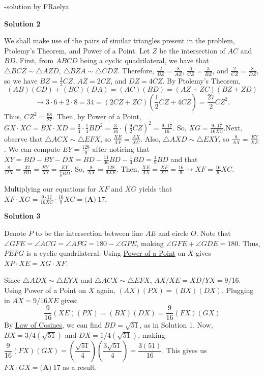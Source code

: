 \begin{enumerate}
 -solution by FRaelya

 



\textbf{Solution 2}

We shall make use of the pairs of similar triangles present in the problem, Ptolemy's Theorem, and Power of a Point. Let $Z$ be the intersection of $AC$ and $BD$. First, from $ABCD$ being a cyclic quadrilateral, we have that $\triangle BCZ \sim \triangle AZD$, $\triangle BZA \sim \triangle CDZ$. Therefore, $\frac{2}{BZ} = \frac{8}{AZ}$, $\frac{6}{CZ} = \frac{3}{BZ}$, and $\frac{2}{CZ} = \frac{8}{DZ}$, so we have $BZ = \frac{1}{2}CZ$, $AZ = 2CZ$, and $DZ = 4CZ$. By Ptolemy's Theorem, 
 \[(AB)(CD) + (BC)(DA) = (AC)(BD) = (AZ + ZC)(BZ + ZD)\] 
 \[\rightarrow 3 \cdot 6 + 2 \cdot 8 = 34 = \left(2CZ + ZC\right)\left(\frac{1}{2}CZ + 4CZ\right) = \frac{27}{2}CZ^2.\] Thus, $CZ^2 = \frac{68}{27}$. Then, by Power of a Point, $GX \cdot XC = BX \cdot XD = \frac{3}{4} \cdot \frac{1}{4}BD^2 = \frac{3}{16} \cdot \left(\frac{9}{2}CZ\right)^2 = \frac{9 \cdot 17}{16}$. So, $XG = \frac{9 \cdot 17}{16XC}$.Next, observe that $\triangle ACX \sim \triangle EFX$, so $\frac{XE}{XF} = \frac{AX}{XC}$. Also, $\triangle{AXD} \sim \triangle{EXY}$, so $\frac{8}{AX} = \frac{EY}{XE}$. We can compute $EY = \frac{128}{9}$ after noticing that $XY = BD - BY - DX = BD - \frac{11}{36}BD - \frac{1}{4}BD = \frac{4}{9}BD$ and that $\frac{8}{DX} = \frac{32}{BD} = \frac{EY}{XY} = \frac{EY}{\frac{4}{9}BD}$. So, $\frac{8}{AX} = \frac{128}{9XE}$. Then, $\frac{XE}{AX} = \frac{XF}{XC} = \frac{16}{9} \rightarrow XF = \frac{16}{9}XC$. 

 Multiplying our equations for $XF$ and $XG$ yields that $XF \cdot XG = \frac{9 \cdot 17}{16XC} \cdot \frac{16}{9}XC = \boxed{\textbf{(A)}\ 17}.$




\textbf{Solution 3}

Denote $P$ to be the intersection between line $AE$ and circle $O$. Note that $\angle GFE = \angle ACG = \angle APG = 180 - \angle GPE$, making $\angle GFE + \angle GDE = 180$. Thus, $PEFG$ is a cyclic quadrilateral. Using \href{https://artofproblemsolving.com/wiki/index.php?title=Power\_of\_a\_Point}{Power of a Point} on $X$ gives $XP \cdot XE = XG \cdot XF$.

 Since $\triangle ADX \sim \triangle EYX$ and $\triangle ACX \sim \triangle EFX$, $AX/XE = XD/YX = 9/16$. Using Power of a Point on $X$ again, $(AX)(PX) = (BX)(DX)$. Plugging in $AX=9/16 XE$ gives:
 \[\dfrac{9}{16}(XE)(PX) = (BX)(DX) = \dfrac{9}{16}(FX)(GX)\]By \href{https://artofproblemsolving.com/wiki/index.php?title=Law\_of\_Cosines}{Law of Cosines}, we can find $BD = \sqrt{51}$, as in Solution 1. Now, $BX = 3/4 (\sqrt{51})$ and $DX = 1/4 (\sqrt{51})$, making $\dfrac{9}{16}(FX)(GX) = \left( \dfrac{\sqrt{51}}{4}\right)\left( \dfrac{3\sqrt{51}}{4}\right) = \dfrac{3(51)}{16}$. This gives us $FX \cdot GX = \boxed{\textbf{(A)}\ 17}$ as a result.


\end{enumerate}
